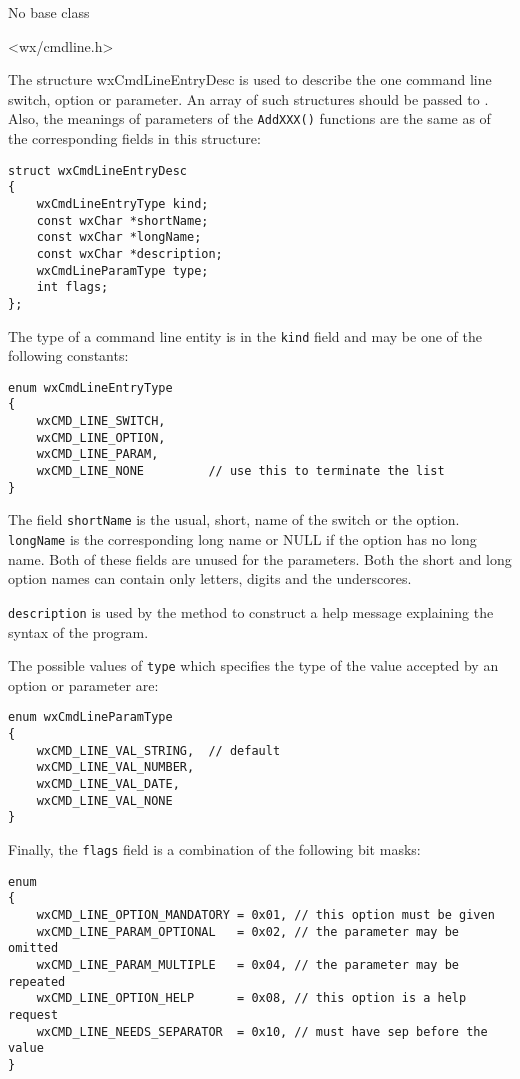 
No base class


<wx/cmdline.h>


The structure wxCmdLineEntryDesc is used to describe the one command
line switch, option or parameter. An array of such structures should be passed
to . Also, the meanings of parameters
of the {\tt AddXXX()} functions are the same as of the corresponding fields in
this structure:

\begin{verbatim}
struct wxCmdLineEntryDesc
{
    wxCmdLineEntryType kind;
    const wxChar *shortName;
    const wxChar *longName;
    const wxChar *description;
    wxCmdLineParamType type;
    int flags;
};
\end{verbatim}

The type of a command line entity is in the {\tt kind} field and may be one of
the following constants:

{\small%
\begin{verbatim}
enum wxCmdLineEntryType
{
    wxCMD_LINE_SWITCH,
    wxCMD_LINE_OPTION,
    wxCMD_LINE_PARAM,
    wxCMD_LINE_NONE         // use this to terminate the list
}
\end{verbatim}
}

The field {\tt shortName} is the usual, short, name of the switch or the option.
{\tt longName} is the corresponding long name or NULL if the option has no long
name. Both of these fields are unused for the parameters. Both the short and
long option names can contain only letters, digits and the underscores.

{\tt description} is used by the  method
to construct a help message explaining the syntax of the program.

The possible values of {\tt type} which specifies the type of the value accepted
by an option or parameter are:

{\small%
\begin{verbatim}
enum wxCmdLineParamType
{
    wxCMD_LINE_VAL_STRING,  // default
    wxCMD_LINE_VAL_NUMBER,
    wxCMD_LINE_VAL_DATE,
    wxCMD_LINE_VAL_NONE
}
\end{verbatim}
}

Finally, the {\tt flags} field is a combination of the following bit masks:

{\small%
\begin{verbatim}
enum
{
    wxCMD_LINE_OPTION_MANDATORY = 0x01, // this option must be given
    wxCMD_LINE_PARAM_OPTIONAL   = 0x02, // the parameter may be omitted
    wxCMD_LINE_PARAM_MULTIPLE   = 0x04, // the parameter may be repeated
    wxCMD_LINE_OPTION_HELP      = 0x08, // this option is a help request
    wxCMD_LINE_NEEDS_SEPARATOR  = 0x10, // must have sep before the value
}
\end{verbatim}
}

